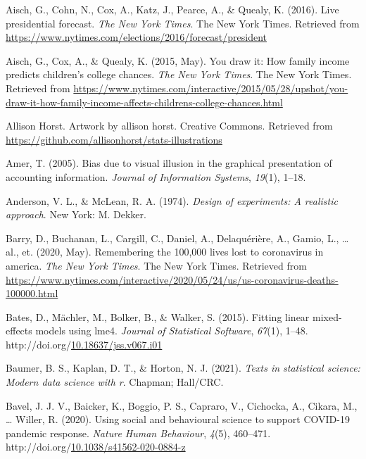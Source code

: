 \documentclass[print]{nuthesis}
\newlength{\cslhangindent}
\newenvironment{CSLReferences}[2]%
{\setlength{\parindent}{0pt}%
\everypar{\setlength{\hangindent}{\cslhangindent}}\ignorespaces}%
{\par}
\begin{document}
\hypertarget{refs}{}
\begin{CSLReferences}{1}{0}
\leavevmode{}%
Aisch, G., Cohn, N., Cox, A., Katz, J., Pearce, A., \& Quealy, K. (2016). Live presidential forecast. \emph{The New York Times}. The New York Times. Retrieved from \url{https://www.nytimes.com/elections/2016/forecast/president}

\leavevmode{}%
Aisch, G., Cox, A., \& Quealy, K. (2015, May). You draw it: How family income predicts children's college chances. \emph{The New York Times}. The New York Times. Retrieved from \url{https://www.nytimes.com/interactive/2015/05/28/upshot/you-draw-it-how-family-income-affects-childrens-college-chances.html}

\leavevmode{}%
Allison Horst. Artwork by allison horst. Creative Commons. Retrieved from \url{https://github.com/allisonhorst/stats-illustrations}

\leavevmode{}%
Amer, T. (2005). Bias due to visual illusion in the graphical presentation of accounting information. \emph{Journal of Information Systems}, \emph{19}(1), 1--18.

\leavevmode{}%
Anderson, V. L., \& McLean, R. A. (1974). \emph{Design of experiments: A realistic approach}. New York: M. Dekker.

\leavevmode{}%
Barry, D., Buchanan, L., Cargill, C., Daniel, A., Delaquérière, A., Gamio, L., \ldots{} al., et. (2020, May). Remembering the 100,000 lives lost to coronavirus in america. \emph{The New York Times}. The New York Times. Retrieved from \url{https://www.nytimes.com/interactive/2020/05/24/us/us-coronavirus-deaths-100000.html}

\leavevmode{}%
Bates, D., Mächler, M., Bolker, B., \& Walker, S. (2015). Fitting linear mixed-effects models using {lme4}. \emph{Journal of Statistical Software}, \emph{67}(1), 1--48. http://doi.org/\href{https://doi.org/10.18637/jss.v067.i01}{10.18637/jss.v067.i01}

\leavevmode{}%
Baumer, B. S., Kaplan, D. T., \& Horton, N. J. (2021). \emph{Texts in statistical science: Modern data science with r}. Chapman; Hall/CRC.

\leavevmode{}%
Bavel, J. J. V., Baicker, K., Boggio, P. S., Capraro, V., Cichocka, A., Cikara, M., \ldots{} Willer, R. (2020). Using social and behavioural science to support {COVID}-19 pandemic response. \emph{Nature Human Behaviour}, \emph{4}(5), 460--471. http://doi.org/\href{https://doi.org/10.1038/s41562-020-0884-z}{10.1038/s41562-020-0884-z}


\end{CSLReferences}
\end{document}
